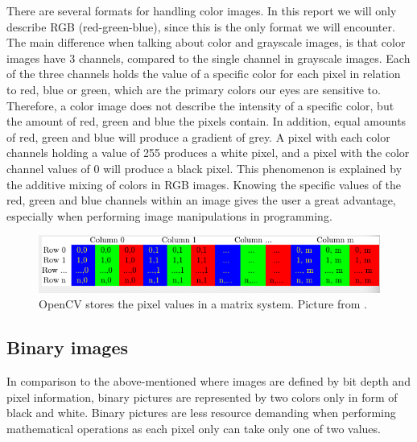 There are several formats for handling color images. In this report we will only describe RGB (red-green-blue), since this is the only format we will encounter. The main difference when talking about color and grayscale images, is that color images have 3 channels, compared to the single channel in grayscale images. Each of the three channels holds the value of a specific color for each pixel in relation to red, blue or green, which are the primary colors our eyes are sensitive to. Therefore, a color image does not describe the intensity of a specific color, but the amount of red, green and blue the pixels contain. In addition, equal amounts of red, green and blue will produce a gradient of grey. A pixel with each color channels holding a value of 255 produces a white pixel, and a pixel with the color channel values of 0 will produce a black pixel. This phenomenon is explained by the additive mixing of colors in RGB images\citep{ip_book}. Knowing the specific values of the red, green and blue channels within an image gives the user a great advantage, especially when performing image manipulations in programming.%

\begin{figure}[htbp]
\centering
\includegraphics[width=1.00\textwidth]{Pictures/Theory/opencv_matrix}
\caption{OpenCV stores the pixel values in a matrix system. Picture from \citep{opencv}.}
\label{fig:opencv_matrix}
\end{figure} 

\subsection{Binary images}
In comparison to the above-mentioned where images are defined by bit depth and pixel information, binary pictures are represented by two colors only in form of black and white. Binary pictures are less resource demanding when performing mathematical operations as each pixel only can take only one of two values.

